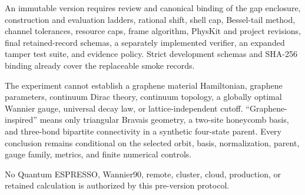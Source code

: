 \documentclass[11pt]{article}
\begin{document}
An immutable version requires review and canonical binding of the gap enclosure,
construction and evaluation ladders, rational shift, shell cap, Bessel-tail method,
channel tolerances, resource caps, frame algorithm, PhysKit and project revisions,
final retained-record schemas, a separately implemented verifier, an expanded tamper
test suite, and evidence policy. Strict development schemas and SHA-256 binding already
cover the replaceable smoke records.

The experiment cannot establish a graphene material Hamiltonian, graphene parameters,
continuum Dirac theory, continuum topology, a globally optimal Wannier gauge, universal
decay law, or lattice-independent cutoff.  ``Graphene-inspired'' means only triangular
Bravais geometry, a two-site honeycomb basis, and three-bond bipartite connectivity in a
synthetic four-state parent.  Every conclusion remains conditional on the selected
orbit, basis, normalization, parent, gauge family, metrics, and finite numerical
controls.

No Quantum ESPRESSO, Wannier90, remote, cluster, cloud, production, or retained
calculation is authorized by this pre-version protocol.



\end{document}
